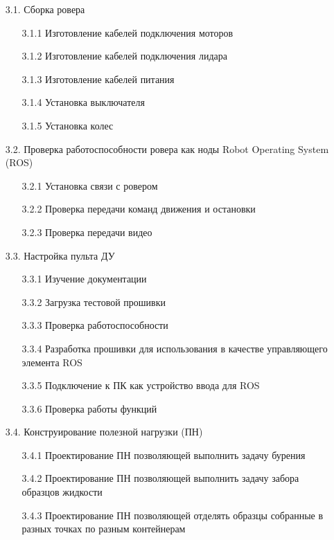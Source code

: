 \begin{enumerate}
    \item[3.1.] Сборка ровера
    \begin{enumerate}
        \item[3.1.1] Изготовление кабелей подключения моторов
        \item[3.1.2] Изготовление кабелей подключения лидара
        \item[3.1.3] Изготовление кабелей питания
        \item[3.1.4] Установка выключателя
        \item[3.1.5] Установка колес
    \end{enumerate}
    \item[3.2.] Проверка работоспособности ровера как ноды Robot Operating System (ROS)
    \begin{enumerate}
        \item[3.2.1] Установка связи с ровером 
        \item[3.2.2] Проверка передачи команд движения и остановки 
        \item[3.2.3] Проверка передачи видео 
    \end{enumerate}
    \item[3.3.] Настройка пульта ДУ
    \begin{enumerate}
        \item[3.3.1] Изучение документации
        \item[3.3.2] Загрузка тестовой прошивки
        \item[3.3.3] Проверка работоспособности
        \item[3.3.4] Разработка прошивки для использования в качестве управляющего элемента ROS
        \item[3.3.5] Подключение к ПК как устройство ввода для ROS
        \item[3.3.6] Проверка работы функций 
    \end{enumerate}
    \item[3.4.] Конструирование полезной нагрузки (ПН)
    \begin{enumerate}
        \item[3.4.1] Проектирование ПН позволяющей выполнить задачу бурения
        \item[3.4.2] Проектирование ПН позволяющей выполнить задачу забора образцов жидкости
        \item[3.4.3] Проектирование ПН позволяющей отделять образцы собранные в разных точках по разным контейнерам
        \begin{itemize}

\end{itemize}
\end{enumerate}
\end{enumerate}

